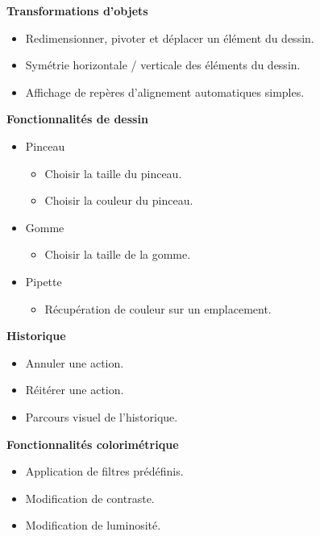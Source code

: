 \documentclass[11pt, a4paper, french]{article}
\begin{document}
			\textbf{Transformations d'objets}
			\begin{itemize}[label=\textbullet]
				\item Redimensionner, pivoter et déplacer un élément du dessin.
				\item Symétrie horizontale / verticale des éléments du dessin.
				\item Affichage de repères d'alignement automatiques simples.\\
			\end{itemize}

			\textbf{Fonctionnalités de dessin}
			\begin{itemize}[label=\textbullet]
				\item Pinceau
					\begin{itemize}[label=\textbullet]
						\item Choisir la taille du pinceau.
						\item Choisir la couleur du pinceau.
					\end{itemize}
				\item Gomme
					\begin{itemize}[label=\textbullet]
						\item Choisir la taille de la gomme.
					\end{itemize}
				\item Pipette
					\begin{itemize}[label=\textbullet]
						\item Récupération de couleur sur un emplacement. \\
					\end{itemize}
			\end{itemize}

			\textbf{Historique}
			\begin{itemize}[label=\textbullet]
				\item Annuler une action.
				\item Réitérer une action.
				\item Parcours visuel de l'historique. \\
			\end{itemize}

			\textbf{Fonctionnalités colorimétrique}
			\begin{itemize}[label=\textbullet]
				\item Application de filtres prédéfinis.
				\item Modification de contraste.
				\item Modification de luminosité.
			\end{itemize}
\end{document}
